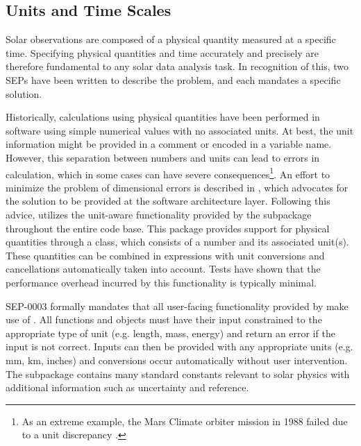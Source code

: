 \subsection{Units and Time Scales}
\label{sec:units}

Solar observations are composed of a physical quantity measured at a specific time.
Specifying physical quantities and time accurately and precisely are therefore fundamental to any solar data analysis task.
In recognition of this, two SEPs have been written to describe the problem, and each mandates a specific solution.

Historically, calculations using physical quantities have been performed in software using simple numerical values with no associated units.
At best, the unit information might be provided in a comment or encoded in a variable name.
However, this separation between numbers and units can lead to errors in calculation, which in some cases can have severe consequences\footnote{As an extreme example, the Mars Climate orbiter mission in 1988 failed due to a unit discrepancy \citep{mco_mishap_report}.}.
An effort to minimize the problem of dimensional errors is described in \citet{Damevski2009}, which advocates for the solution to be provided at the software architecture layer.
Following this advice, \sunpypkg utilizes the unit-aware functionality provided by the  subpackage throughout the entire code base.
This package provides support for physical quantities through a  class, which consists of a number and its associated unit(s).
These quantities can be combined in expressions with unit conversions and cancellations automatically taken into account.
Tests have shown that the performance overhead incurred by this functionality is typically minimal.

SEP-0003 \citep{sep-0003} formally mandates that all user-facing functionality provided by \sunpypkg make use of .
All functions and objects must have their input constrained to the appropriate type of unit (e.g. length, mass, energy) and return an error if the input is not correct.
Inputs can then be provided with any appropriate units (e.g. mm, km, inches) and conversions occur automatically without user intervention.
The  subpackage contains many standard constants relevant to solar physics with additional information such as uncertainty and reference.

